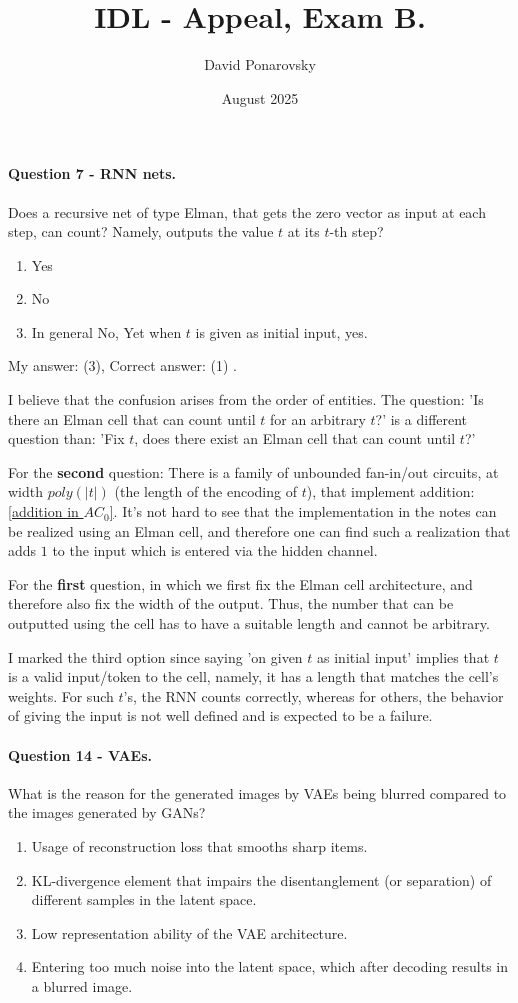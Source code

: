 \documentclass{article}
\title{IDL - Appeal, Exam B. }
\author{David Ponarovsky}
\date{August 2025}
\newcommand{\inb}[1]{ \color{blue}#1 \color{black} }
\begin{document}
\maketitle

\paragraph{ Question 7 - RNN nets.} 
Does a recursive net of type Elman, that gets the zero vector as input at each step, can count? Namely, outputs the value $t$ at its $t$-th step?
\begin{enumerate}
  \item Yes
  \item No
  \item In general No, Yet when $t$ is given as initial input, yes. 
\end{enumerate}
\inb{ My answer: (3), Correct answer: (1)}. 


I believe that the confusion arises from the order of entities. The question: 'Is there an Elman cell that can count until $t$ for an arbitrary $t$?' is a different question than: 'Fix $t$, does there exist an Elman cell that can count until $t$?'

For the \textbf{second} question: There is a family of unbounded fan-in/out circuits, at width $poly(|t|)$ (the length of the encoding of $t$), that implement addition: \href{https://people.clarkson.edu/~alexis/PCMI/Notes/lectureB02.pdf}{[addition in $AC_{0}$]}. It's not hard to see that the implementation in the notes can be realized using an Elman cell, and therefore one can find such a realization that adds $1$ to the input which is entered via the hidden channel.

For the \textbf{first} question, in which we first fix the Elman cell architecture, and therefore also fix the width of the output. Thus, the number that can be outputted using the cell has to have a suitable length and cannot be arbitrary.

I marked the third option since saying 'on given $t$ as initial input' implies that $t$ is a valid input/token to the cell, namely, it has a length that matches the cell's weights. For such $t$'s, the RNN counts correctly, whereas for others, the behavior of giving the input is not well defined and is expected to be a failure.


\paragraph{Question 14 - VAEs.} What is the reason for the generated images by VAEs being blurred compared to the images generated by GANs?   
\begin{enumerate}
  \item Usage of reconstruction loss that smooths sharp items.   
  \item KL-divergence element that impairs the disentanglement (or separation) of different samples in the latent space. 
  \item Low representation ability of the VAE architecture. 
  \item Entering too much noise into the latent space, which after decoding results in a blurred image. 
\end{enumerate}
\end{document}
